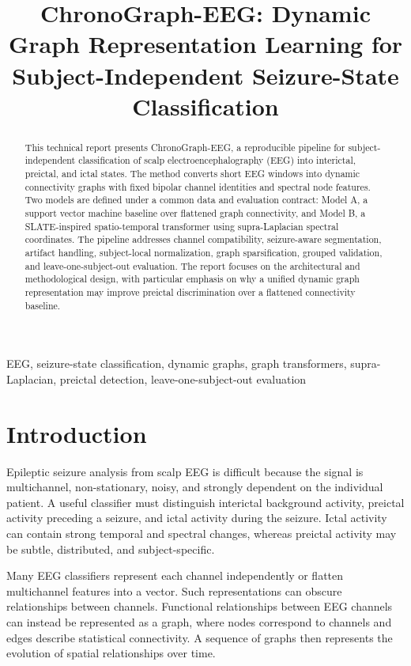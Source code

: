 \documentclass[conference]{IEEEtran}
\title{ChronoGraph-EEG: Dynamic Graph Representation Learning for Subject-Independent Seizure-State Classification}
\author{\IEEEauthorblockN{Authors to be added}
\IEEEauthorblockA{Biomedical Signal Processing and Machine Learning\\
Affiliation to be added}}
\begin{document}
\maketitle

\begin{abstract}
This technical report presents ChronoGraph-EEG, a reproducible pipeline for subject-independent classification of scalp electroencephalography (EEG) into interictal, preictal, and ictal states. The method converts short EEG windows into dynamic connectivity graphs with fixed bipolar channel identities and spectral node features. Two models are defined under a common data and evaluation contract: Model A, a support vector machine baseline over flattened graph connectivity, and Model B, a SLATE-inspired spatio-temporal transformer using supra-Laplacian spectral coordinates. The pipeline addresses channel compatibility, seizure-aware segmentation, artifact handling, subject-local normalization, graph sparsification, grouped validation, and leave-one-subject-out evaluation. The report focuses on the architectural and methodological design, with particular emphasis on why a unified dynamic graph representation may improve preictal discrimination over a flattened connectivity baseline.
\end{abstract}

\begin{IEEEkeywords}
EEG, seizure-state classification, dynamic graphs, graph transformers, supra-Laplacian, preictal detection, leave-one-subject-out evaluation
\end{IEEEkeywords}

\section{Introduction}
Epileptic seizure analysis from scalp EEG is difficult because the signal is multichannel, non-stationary, noisy, and strongly dependent on the individual patient. A useful classifier must distinguish interictal background activity, preictal activity preceding a seizure, and ictal activity during the seizure. Ictal activity can contain strong temporal and spectral changes, whereas preictal activity may be subtle, distributed, and subject-specific.

Many EEG classifiers represent each channel independently or flatten multichannel features into a vector. Such representations can obscure relationships between channels. Functional relationships between EEG channels can instead be represented as a graph, where nodes correspond to channels and edges describe statistical connectivity. A sequence of graphs then represents the evolution of spatial relationships over time.
\end{document}
